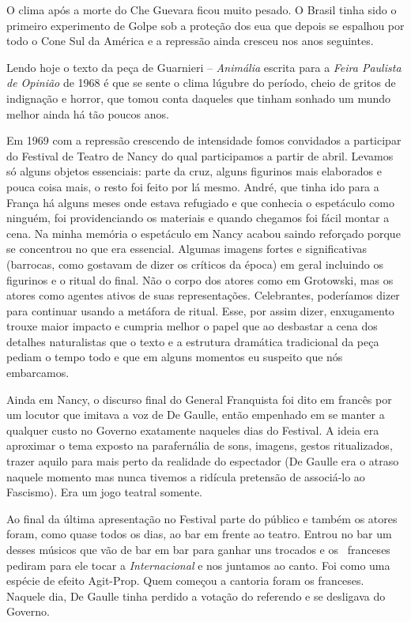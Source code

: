 O clima após a morte do Che Guevara ficou muito pesado. O Brasil tinha
sido o primeiro experimento de Golpe sob a proteção dos {\sc eua} que depois
se espalhou por todo o Cone Sul da América e a repressão ainda cresceu
nos anos seguintes.

Lendo hoje o texto da peça de Guarnieri -- {\it Animália} escrita para a
{\it Feira Paulista de Opinião} de 1968 é que se sente o clima lúgubre
do período, cheio de gritos de indignação e horror, que tomou conta
daqueles que tinham sonhado um mundo melhor ainda há tão poucos anos.

Em 1969 com a repressão crescendo de intensidade fomos convidados a
participar do Festival de Teatro de Nancy do qual participamos a partir
de abril. Levamos só alguns objetos essenciais: parte da cruz, alguns
figurinos mais elaborados e pouca coisa mais, o resto foi feito por lá
mesmo. André, que tinha ido para a França há alguns meses onde estava
refugiado e que conhecia o espetáculo como ninguém, foi providenciando
os materiais e quando chegamos foi fácil montar a cena. Na minha memória
o espetáculo em Nancy acabou saindo reforçado porque se concentrou no
que era essencial. Algumas imagens fortes e significativas (barrocas,
como gostavam de dizer os críticos da época) em geral incluindo os
figurinos e o ritual do final. Não o corpo dos atores como em Grotowski,
mas os atores como agentes ativos de suas representações. Celebrantes,
poderíamos dizer para continuar usando a metáfora de ritual. Esse, por
assim dizer, enxugamento trouxe maior impacto e cumpria melhor o papel
que ao desbastar a cena dos detalhes naturalistas que o texto e a
estrutura dramática tradicional da peça pediam o tempo todo e que em
alguns momentos eu suspeito que nós embarcamos.

Ainda em Nancy, o discurso final do General Franquista foi dito em
francês por um locutor que imitava a voz de De Gaulle, então empenhado
em se manter a qualquer custo no Governo exatamente naqueles dias do
Festival. A ideia era aproximar o tema exposto na parafernália de sons,
imagens, gestos ritualizados, trazer aquilo para mais perto da realidade
do espectador (De Gaulle era o atraso naquele momento mas nunca tivemos
a ridícula pretensão de associá-lo ao Fascismo). Era um jogo teatral
somente.

Ao final da última apresentação no Festival parte do público e também os
atores foram, como quase todos os dias, ao bar em frente ao teatro.
Entrou no bar um desses músicos que vão de bar em bar para ganhar uns
trocados e os ~franceses pediram para ele tocar a {\it Internacional} e
nos juntamos ao canto. Foi como uma espécie de efeito Agit-Prop. Quem
começou a cantoria foram os franceses. Naquele dia, De Gaulle tinha
perdido a votação do referendo e se desligava do Governo.

